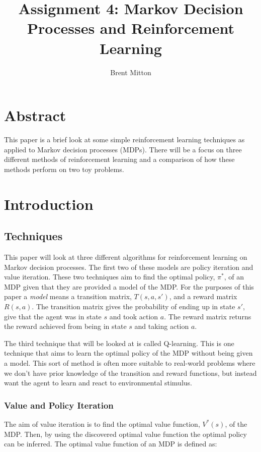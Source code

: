 \documentclass[a4paper,10pt]{article}
\title{Assignment 4: Markov Decision Processes and Reinforcement Learning}
\author{Brent Mitton}
\begin{document}
\maketitle

\section{Abstract}
This paper is a brief look at some simple reinforcement learning techniques as applied to Markov decision processes (MDPs). There will be a focus on three different methods of reinforcement learning and a comparison of how these methods perform on two toy problems.

\section{Introduction}
\subsection{Techniques}
This paper will look at three different algorithms for reinforcement learning on Markov decision processes. The first two of these models are policy iteration and value iteration. These two techniques aim to find the optimal policy, $\pi^*$, of an MDP given that they are provided a  model of the MDP. For the purposes of this paper a \textit{model} means a transition matrix, $T(s, a, s')$, and a reward matrix $R(s, a)$. The transition matrix gives the probability of ending up in state $s'$, give that the agent was in state $s$ and took action $a$. The reward matrix returns the reward achieved from being in state $s$ and taking action $a$. 

The third technique that will be looked at is called Q-learning. This is one technique that aims to learn the optimal policy of the MDP without being given a model. This sort of method is often more suitable to real-world problems where we don't have prior knowledge of the transition and reward functions, but instead want the agent to learn and react to environmental stimulus.

\subsubsection{Value and Policy Iteration}
The aim of value iteration is to find the optimal value function, $V^*(s)$, of the MDP. Then, by using the discovered optimal value function the optimal policy can be inferred. The optimal value function of an MDP is defined as:
\end{document}
